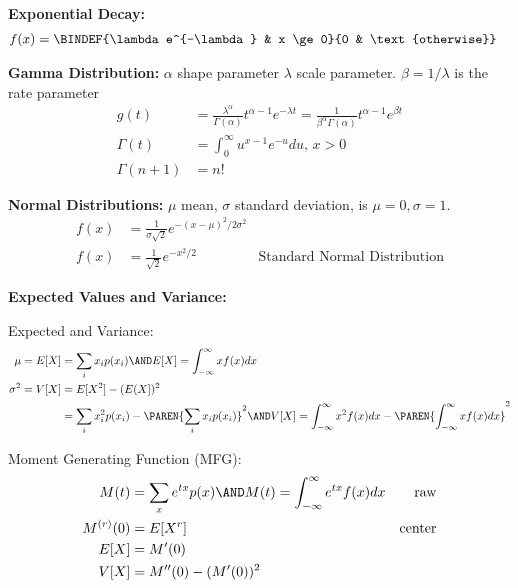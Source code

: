 \documentclass[10pt,a4paper]{report}
\begin{document}
\begin{description}
\begin{description}
	\item \textbf{Exponential Decay: }
	\begin{align*}
		f(x) &= \BINDEF{\lambda e^{-\lambda} & x \ge 0}{0 & \text{otherwise}}
	\end{align*}
	
	\item \textbf{Gamma Distribution: }$\alpha$ shape parameter $\lambda$ scale parameter.  $\beta = 1/\lambda$ is the rate parameter
	\begin{align*}
		g(t) &= \frac{\lambda^\alpha}{\Gamma(\alpha)}t^{\alpha-1}e^{-\lambda t} = \frac{1}{\beta^\alpha\Gamma(\alpha)}t^{\alpha-1}e^{\beta t} \\
		\Gamma(t) &= \int_0^\infty u^{x-1}e^{-u} du,\, x >0 \\
		\Gamma(n+1) &= n!
	\end{align*}
	
	\item \textbf{Normal Distributions:} $\mu$ mean, $\sigma$ standard deviation,  is $\mu=0, \sigma = 1$.
	\begin{align*}
		f(x) &= \frac{1}{\sigma\sqrt{2}}e^{-(x-\mu)^2/2\sigma^2} \\
		f(x) &= \frac{1}{\sqrt{2}}e^{-x^2/2} & \text{Standard Normal Distribution}
	\end{align*}
\end{description}
\item \textbf{Expected Values and Variance:}
	\begin{description}
		\item Expected and Variance:
		\begin{align*}
			\mu = E[X] &= \sum_i x_ip(x_i) \AND E[X] = \int_{-\infty}^\infty xf(x)dx \\
			\sigma^2 = V[X] &= E[X^2]-(E(X])^2\\
			&= \sum_i x_i^2p(x_i) - \PAREN{\sum_i x_ip(x_i)}^2 \AND V[X] = \int_{-\infty}^\infty x^2f(x)dx - \PAREN{\int_{-\infty}^\infty xf(x)dx}^2
		\end{align*}
		\item Moment Generating Function (MFG):
		\begin{align*}
			M(t) &= \sum_x e^{tx} p(x) \AND M(t)=\int_{-\infty}^\infty e^{tx}f(x)dx & \text{raw}\\
			M^{(r)}(0) &= E[X^r] & \text{center} \\
			E[X] &= M'(0)\\
			V[X] &= M''(0) - (M'(0))^2
		\end{align*}
	\end{description}


\end{description}
\end{document}
